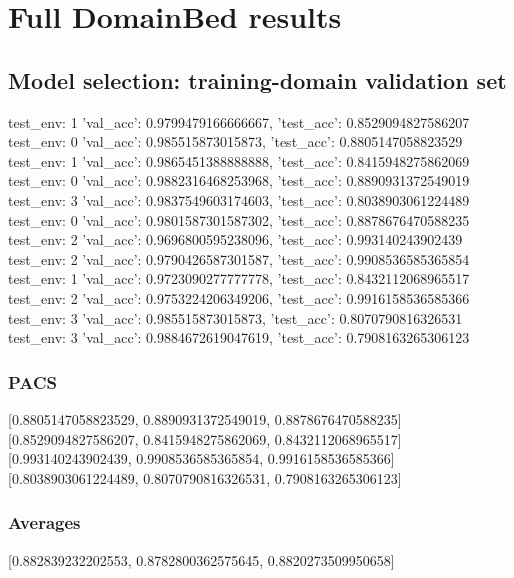 \documentclass{article}
\begin{document}
\section{Full DomainBed results}

\subsection{Model selection: training-domain validation set}
test_env: 1
{'val_acc': 0.9799479166666667, 'test_acc': 0.8529094827586207}
test_env: 0
{'val_acc': 0.985515873015873, 'test_acc': 0.8805147058823529}
test_env: 1
{'val_acc': 0.9865451388888888, 'test_acc': 0.8415948275862069}
test_env: 0
{'val_acc': 0.9882316468253968, 'test_acc': 0.8890931372549019}
test_env: 3
{'val_acc': 0.9837549603174603, 'test_acc': 0.8038903061224489}
test_env: 0
{'val_acc': 0.9801587301587302, 'test_acc': 0.8878676470588235}
test_env: 2
{'val_acc': 0.9696800595238096, 'test_acc': 0.993140243902439}
test_env: 2
{'val_acc': 0.9790426587301587, 'test_acc': 0.9908536585365854}
test_env: 1
{'val_acc': 0.9723090277777778, 'test_acc': 0.8432112068965517}
test_env: 2
{'val_acc': 0.9753224206349206, 'test_acc': 0.9916158536585366}
test_env: 3
{'val_acc': 0.985515873015873, 'test_acc': 0.8070790816326531}
test_env: 3
{'val_acc': 0.9884672619047619, 'test_acc': 0.7908163265306123}

\subsubsection{PACS}
[0.8805147058823529, 0.8890931372549019, 0.8878676470588235]
[0.8529094827586207, 0.8415948275862069, 0.8432112068965517]
[0.993140243902439, 0.9908536585365854, 0.9916158536585366]
[0.8038903061224489, 0.8070790816326531, 0.7908163265306123]

\begin{center}
\end{center}

\subsubsection{Averages}
[0.882839232202553, 0.8782800362575645, 0.8820273509950658]

\begin{center}
\end{center}
\end{document}
